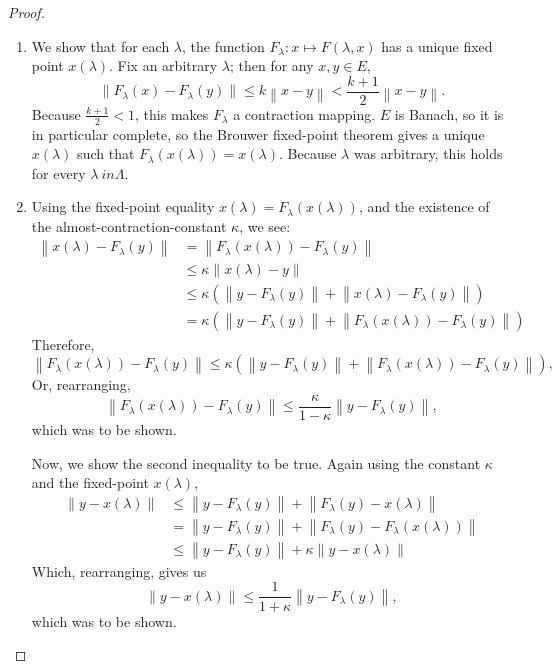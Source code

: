 \documentclass[12pt]{article}
\theoremstyle{definition}
\begin{document}
\begin{proof}
	\begin{enumerate}[label=(\roman*)]
		\item We show that for each $\lambda$, the function $F_\lambda: x \mapsto F(\lambda, x)$ has a unique fixed point $x(\lambda)$. Fix an arbitrary $\lambda$; then for any $x, y \in E$, 
			\[\lVert F_\lambda(x) - F_\lambda(y) \rVert \leq k \left \lVert {  x - y } \right \lVert < \frac{k+1}{2}\left \lVert { x - y } \right \lVert. \]
			Because $\frac{k+1}{2} < 1$, this makes $F_\lambda$ a contraction mapping. $E$ is Banach, so it is in particular complete, so the Brouwer fixed-point theorem gives a unique $x(\lambda)$ such that $F_\lambda(x(\lambda)) = x(\lambda)$. Because $\lambda$ was arbitrary, this holds for every $\lambda \ in \Lambda$.
		\item Using the fixed-point equality $x(\lambda) = F_\lambda(x(\lambda))$, and the existence of the almost-contraction-constant $\kappa$, we see:
			\begin{align*}
				\left \lVert { x(\lambda) - F_\lambda(y) } \right \lVert &= \left \lVert { F_\lambda(x(\lambda)) - F_\lambda(y) } \right \lVert \\
				&\leq \kappa \left \lVert { x(\lambda) - y } \right \lVert \\
				&\leq \kappa (\left \lVert { y - F_\lambda(y) } \right \lVert  + \left \lVert { x(\lambda) - F_\lambda(y) } \right \lVert )\\
				&= \kappa (\left \lVert { y - F_\lambda(y) } \right \lVert + \left \lVert { F_\lambda(x(\lambda)) - F_\lambda(y) } \right \lVert )
			\end{align*}
			Therefore,
			\[\left \lVert { F_\lambda(x(\lambda)) - F_\lambda(y) } \right \lVert \leq \kappa(\left \lVert { y - F_\lambda(y) } \right \lVert + \left \lVert { F_\lambda(x(\lambda)) - F_\lambda(y) } \right \lVert ),\]
			Or, rearranging,
			\[\left \lVert { F_\lambda(x(\lambda)) - F_\lambda(y) } \right \lVert \leq \frac{\kappa}{1 - \kappa}\left \lVert { y - F_\lambda(y) } \right \lVert, \]
			which was to be shown.
			\par Now, we show the second inequality to be true. Again using the constant $\kappa$ and the fixed-point $x(\lambda)$,
			\begin{align*}
				\left \lVert { y - x(\lambda) } \right \lVert &\leq \left \lVert { y - F_\lambda(y) } \right \lVert  + \left \lVert { F_\lambda(y) - x(\lambda) } \right \lVert \\
				&= \left \lVert { y - F_\lambda(y) } \right \lVert + \left \lVert { F_\lambda(y) - F_\lambda(x(\lambda)) } \right \lVert \\
				&\leq \left \lVert { y - F_\lambda(y) } \right \lVert + \kappa\left \lVert { y - x(\lambda) } \right \lVert 
			\end{align*}
			Which, rearranging, gives us
			\[\left \lVert { y - x(\lambda) } \right \lVert \leq \frac{1}{1+\kappa}\left \lVert { y - F_\lambda(y) } \right \lVert, \]
			which was to be shown.
	\end{enumerate}
\end{proof}
\end{document}
